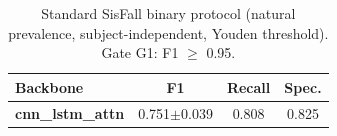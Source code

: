 \begin{table}[!t]
\centering
\caption{Standard SisFall binary protocol (natural prevalence, subject-independent, Youden threshold). Gate G1: F1 $\ge$ 0.95.}
\label{tab:standardprotocol}
\begin{tabular}{lccc}
\toprule
Backbone & F1 & Recall & Spec. \\
\midrule
\textbf{cnn\_lstm\_attn} & 0.751$\pm$0.039 & 0.808 & 0.825 \\
\bottomrule
\end{tabular}
\end{table}
